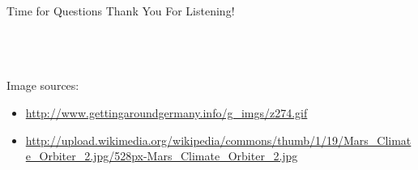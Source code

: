 \documentclass{beamer}
\begin{document}
  \begin{frame}{Time for Questions}
    \huge{Thank You For Listening!}
    \\\ \\\ \\\
    \tiny{
    Image sources: \\
      \begin{itemize}
        \item \url{http://www.gettingaroundgermany.info/g_imgs/z274.gif}
        \item \url{http://upload.wikimedia.org/wikipedia/commons/thumb/1/19/Mars_Climate_Orbiter_2.jpg/528px-Mars_Climate_Orbiter_2.jpg}
      \end{itemize}
    }

  \end{frame}

\end{document}
